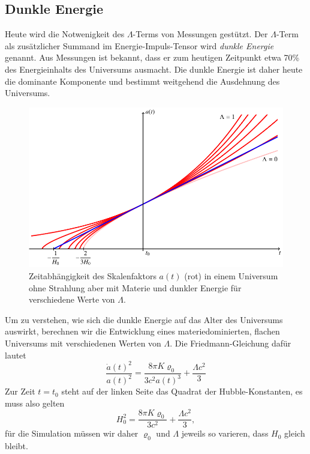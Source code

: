\subsection{Dunkle Energie}
Heute wird die Notwenigkeit des $\Lambda$-Terms von Messungen
gestützt.
Der $\Lambda$-Term als zusätzlicher Summand im Energie-Impuls-Tensor
wird {\em dunkle Energie} genannt.
Aus Messungen ist bekannt, dass er zum heutigen Zeitpunkt etwa 70\%
des Energieinhalts des Universums ausmacht.
Die dunkle Energie ist daher heute die dominante Komponente und
bestimmt weitgehend die Ausdehnung des Universums.
\begin{figure}
\centering
\includegraphics{chapters/tikz/darkenergy.pdf}
\caption{Zeitabhängigkeit des Skalenfaktors $a(t)$ ({\color{red}rot})
in einem Universum ohne Strahlung aber mit Materie und dunkler Energie
für verschiedene Werte von $\Lambda$.
\label{skript:friedman:graph:darkenergy}}
\end{figure}

Um zu verstehen, wie sich die dunkle Energie auf das Alter des Universums
auswirkt, berechnen wir die Entwicklung eines materiedominierten, flachen 
Universums mit verschiedenen Werten von $\Lambda$.
Die Friedmann-Gleichung dafür lautet
\[
\frac{\dot a(t)^2}{a(t)^2}
=
\frac{8\pi K \varrho_0}{3c^2a(t)^3} + \frac{\Lambda c^2}{3}
\]
Zur Zeit $t=t_0$ steht auf der linken Seite das Quadrat der Hubble-Konstanten,
es muss also gelten
\[
H_0^2
=
\frac{8\pi K \varrho_0}{3c^2} + \frac{\Lambda c^2}{3},
\]
für die Simulation müssen wir daher $\varrho_0$ und $\Lambda$ jeweils
so varieren, dass $H_0$ gleich bleibt.

